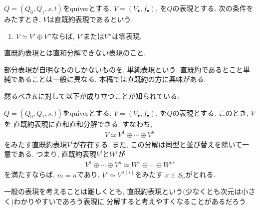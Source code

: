 \begin{definition}
  $Q=(Q_0,Q_1,s,t)$をquiverとする.
  $V=(V_\bullet,f_\bullet)$,
  を$Q$の表現とする.
  次の条件をみたすとき,
  $V$は直既約表現であるという:
  \begin{enumerate}
  \item $V\simeq V'\oplus V''$ならば, $V'$または$V''$は零表現.
  \end{enumerate}
\end{definition}
\begin{remark}
  直既約表現とは直和分解できない表現のこと.
\end{remark}

\begin{remark}
  部分表現が自明なものしかないものを, 単純表現という.
  直既約であるとこと単純であることは一般に異なる.
  本稿では直既約の方に興味がある.
\end{remark}


然るべき$K$に対して以下が成り立つことが知られている:
\begin{prop}
  $Q=(Q_0,Q_1,s,t)$をquiverとする.
  $V=(V_\bullet,f_\bullet)$,
  を$Q$の表現とする.
  このとき,
  $V$を
  直既約表現に直和直和分解できる.
  すなわち,
  \begin{align*}
    V\simeq V^1\oplus\cdots\oplus V^n
  \end{align*}
  をみたす直既約表現$V^i$が存在する.
  また, この分解は同型と並び替えを除いて一意である.
  つまり,
  直既約表現$V^i$と$W^i$が
  \begin{align*}
    V^1\oplus\cdots \oplus V^n\simeq W^1\oplus\cdots\oplus W^m
  \end{align*}
  を満たすならば, $m=n$であり,
  $V^i\simeq V^{\sigma(i)}$をみたす
  $\sigma\in S_n$がとれる.
\end{prop}

\begin{remark}
  一般の表現を考えることは難しくとも,
  直既約表現という(少なくとも次元は小さく)わかりやすいであろう表現に
  分解すると考えやすくなることがあるだろう.
\end{remark}

